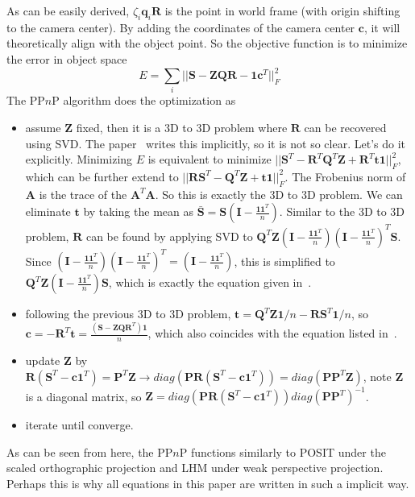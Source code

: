 \documentclass[a4paper]{report}
\begin{document}
As can be easily derived, $\zeta_i \mathbf{q}_i \mathbf{R}$ is the point in world frame (with origin shifting to the camera center). By adding the coordinates of the camera center $\mathbf{c}$, it will theoretically align with the object point. So the objective function is to minimize the error in object space
$$
E=\sum_{i} ||\mathbf{S}-\mathbf{ZQR}-\mathbf{1c}^T||_{F}^{2}
$$
The PP$n$P algorithm does the optimization as
\begin{itemize}
\item assume $\mathbf{Z}$ fixed, then it is a $3$D to $3$D problem where $\mathbf{R}$ can be recovered using SVD. The paper~\cite{garro2012solving} writes this implicitly, so it is not so clear. Let's do it explicitly. Minimizing $E$ is equivalent to minimize $||\mathbf{S}^T-\mathbf{R}^T\mathbf{Q}^T\mathbf{Z}+\mathbf{R}^T\mathbf{t1}||_{F}^{2}$, which can be further extend to $||\mathbf{R}\mathbf{S}^T-\mathbf{Q}^T\mathbf{Z}+\mathbf{t1}||_{F}^{2}$. The Frobenius norm of $\mathbf{A}$ is the trace of the $\mathbf{A}^T\mathbf{A}$. So this is exactly the $3$D to $3$D problem. We can eliminate $\mathbf{t}$ by taking the mean as $\bar{\mathbf{S}}=\mathbf{S}(\mathbf{I}-\frac{\mathbf{11}^T}{n})$. Similar to the $3$D to $3$D problem, $\mathbf{R}$ can be found by applying SVD to $\mathbf{Q}^T\mathbf{Z}(\mathbf{I}-\frac{\mathbf{11}^T}{n})(\mathbf{I}-\frac{\mathbf{11}^T}{n})^T\mathbf{S}$. Since $(\mathbf{I}-\frac{\mathbf{11}^T}{n})(\mathbf{I}-\frac{\mathbf{11}^T}{n})^T=(\mathbf{I}-\frac{\mathbf{11}^T}{n})$, this is simplified to $\mathbf{Q}^T\mathbf{Z}(\mathbf{I}-\frac{\mathbf{11}^T}{n})\mathbf{S}$, which is exactly the equation given in~\cite{garro2012solving}.
\item following the previous $3$D to $3$D problem, $\mathbf{t}=\mathbf{Q}^T\mathbf{Z1}/n-\mathbf{R}\mathbf{S}^T\mathbf{1}/n$, so $\mathbf{c}=-\mathbf{R}^T\mathbf{t}=\frac{({\mathbf{S}-\mathbf{ZQR}}^T)\mathbf{1}}{n}$, which also coincides with the equation listed in~\cite{garro2012solving}.
\item update $\mathbf{Z}$ by $\mathbf{R}(\mathbf{S}^T-\mathbf{c1}^T)=\mathbf{P}^T\mathbf{Z} \to diag(\mathbf{P}\mathbf{R}(\mathbf{S}^T-\mathbf{c1}^T))=diag(\mathbf{P}\mathbf{P}^T\mathbf{Z})$, note $\mathbf{Z}$ is a diagonal matrix, so $\mathbf{Z}=diag(\mathbf{P}\mathbf{R}(\mathbf{S}^T-\mathbf{c1}^T))diag(\mathbf{P}\mathbf{P}^T)^{-1}$.
\item iterate until converge.
\end{itemize}
As can be seen from here, the PP$n$P functions similarly to POSIT under the scaled orthographic projection and LHM under weak perspective projection. Perhaps this is why all equations in this paper are written in such a implicit way.
\end{document}
